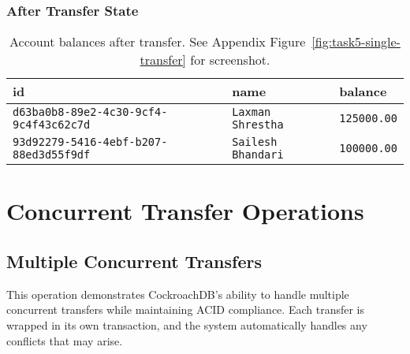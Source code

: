 \subsubsection{After Transfer State}
\begin{table}[H]
  \centering
  \begin{tabular}{|l|l|l|}
    \hline
    \textbf{id} & \textbf{name} & \textbf{balance} \\
    \hline
    \texttt{d63ba0b8-89e2-4c30-9cf4-9c4f43c62c7d} & \texttt{Laxman Shrestha} & \texttt{125000.00} \\
    \texttt{93d92279-5416-4ebf-b207-88ed3d55f9df} & \texttt{Sailesh Bhandari} & \texttt{100000.00} \\
    \hline
  \end{tabular}
  \caption{Account balances after transfer. See Appendix Figure~\ref{fig:task5-single-transfer} for screenshot.}
\end{table}

\section{Concurrent Transfer Operations}

\subsection{Multiple Concurrent Transfers}
This operation demonstrates CockroachDB's ability to handle multiple concurrent transfers while maintaining ACID compliance. Each transfer is wrapped in its own transaction, and the system automatically handles any conflicts that may arise.

